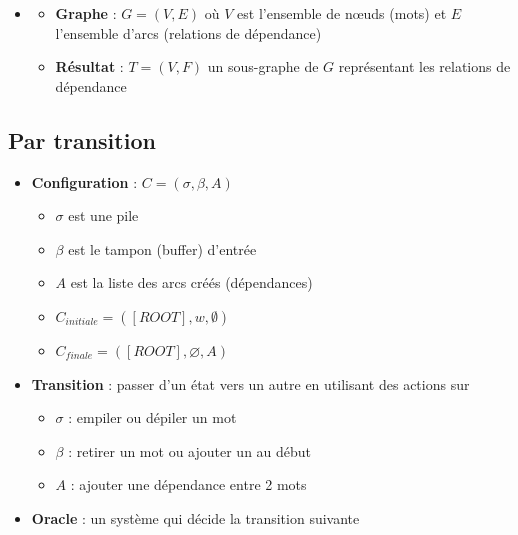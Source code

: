 \documentclass{KodeBook}
\begin{document}
\begin{minipage}{.6\textwidth}
	\begin{itemize}
		\item {}
		\begin{itemize}
			\item \textbf{Graphe} : $G = (V, E)$ où $V$ est l'ensemble de nœuds (mots) et $E$ l'ensemble d'arcs (relations de dépendance)
			\item \textbf{Résultat} : $T = (V, F)$ un sous-graphe de $G$ représentant les relations de dépendance
		\end{itemize}
	\end{itemize}
\end{minipage}
\begin{minipage}{.38\textwidth}
\end{minipage}

\subsection{Par transition}

\begin{minipage}{.6\textwidth}
	\begin{itemize}
		\item \textbf{Configuration} :  $C = (\sigma, \beta, A)$
		\begin{itemize}
			\item $\sigma$ est une pile
			\item $\beta$ est le tampon (buffer) d'entrée
			\item $A$ est la liste des arcs créés (dépendances)
			\item $C_{initiale} = ([ROOT], w, \emptyset)$
			\item $C_{finale} = ([ROOT], \varnothing, A)$
		\end{itemize}
	\end{itemize}
\end{minipage}
\begin{minipage}{.38\textwidth}
\end{minipage}

\begin{itemize}
	\item \textbf{Transition} : passer d'un état vers un autre en utilisant des actions sur
	\begin{itemize}
		\item $\sigma$ : empiler ou dépiler un mot
		\item $\beta$ : retirer un mot ou ajouter un au début
		\item $A$ : ajouter une dépendance entre 2 mots
	\end{itemize}
	\item \textbf{Oracle} : un système qui décide la transition suivante
\end{itemize}
\end{document}
